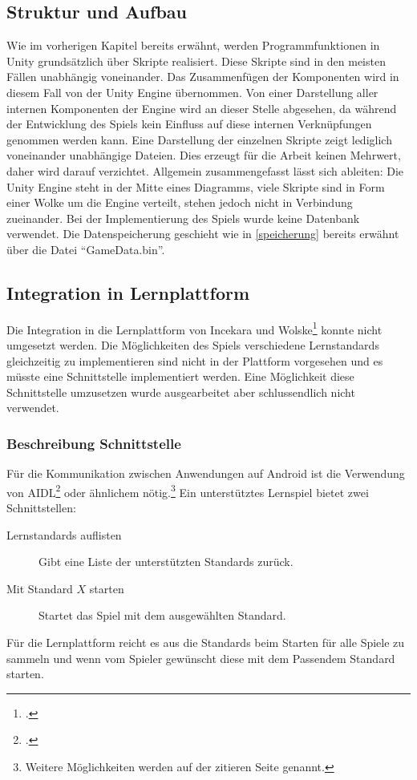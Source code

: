 \subsection{Struktur und Aufbau}
Wie im vorherigen Kapitel bereits erwähnt, werden Programmfunktionen in Unity grundsätzlich über Skripte realisiert. Diese Skripte sind in den meisten Fällen unabhängig voneinander. Das Zusammenfügen der Komponenten wird in diesem Fall von der Unity Engine übernommen. Von einer Darstellung aller internen Komponenten der Engine wird an dieser Stelle abgesehen, da während der Entwicklung des Spiels kein Einfluss auf diese internen Verknüpfungen genommen werden kann. Eine Darstellung der einzelnen Skripte zeigt lediglich voneinander unabhängige Dateien. Dies erzeugt für die Arbeit keinen Mehrwert, daher wird darauf verzichtet. Allgemein zusammengefasst lässt sich ableiten: Die Unity Engine steht in der Mitte eines Diagramms, viele Skripte sind in Form einer Wolke um die Engine verteilt, stehen jedoch nicht in Verbindung zueinander.
Bei der Implementierung des Spiels wurde keine Datenbank verwendet. Die Datenspeicherung geschieht wie in \ref{speicherung} bereits erwähnt über die Datei \enquote{GameData.bin}.

\subsection{Integration in Lernplattform}
	Die Integration in die Lernplattform von Incekara und Wolske\footcite{lernplattform} konnte nicht umgesetzt werden. Die Möglichkeiten des Spiels verschiedene Lernstandards gleichzeitig zu implementieren sind nicht in der Plattform vorgesehen und es müsste eine Schnittstelle implementiert werden.
	Eine Möglichkeit diese Schnittstelle umzusetzen wurde ausgearbeitet aber schlussendlich nicht verwendet.
	\subsubsection*{Beschreibung Schnittstelle}
		Für die Kommunikation zwischen Anwendungen auf Android ist die Verwendung von AIDL\footcite{android-interfaces} oder ähnlichem nötig.\footnote{Weitere Möglichkeiten werden auf der zitieren Seite genannt.}
		Ein unterstütztes Lernspiel bietet zwei Schnittstellen:
		\begin{description}
			\item[Lernstandards auflisten]{
				Gibt eine Liste der unterstützten Standards zurück.
			}
			\item[Mit Standard $X$ starten]{
				Startet das Spiel mit dem ausgewählten Standard.
			}
		\end{description}
		Für die Lernplattform reicht es aus die Standards beim Starten für alle Spiele zu sammeln und wenn vom Spieler gewünscht diese mit dem Passendem Standard starten.
